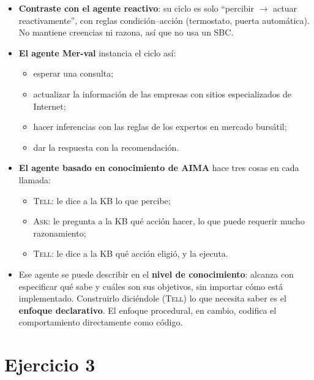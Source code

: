 \documentclass[11pt,a4paper]{article}
\begin{document}
\begin{extras}
\begin{itemize}
  \item \textbf{Contraste con el agente reactivo}: su ciclo es solo ``percibir $\to$ actuar reactivamente'', con reglas condición--acción (termostato, puerta automática). No mantiene creencias ni razona, así que no usa un SBC.
  \item \textbf{El agente Mer-val} instancia el ciclo así:
  \begin{itemize}
    \item esperar una consulta;
    \item actualizar la información de las empresas con sitios especializados de Internet;
    \item hacer inferencias con las reglas de los expertos en mercado bursátil;
    \item dar la respuesta con la recomendación.
  \end{itemize}
  \item \textbf{El agente basado en conocimiento de AIMA} hace tres cosas en cada llamada:
  \begin{itemize}
    \item \textsc{Tell}: le dice a la KB lo que percibe;
    \item \textsc{Ask}: le pregunta a la KB qué acción hacer, lo que puede requerir mucho razonamiento;
    \item \textsc{Tell}: le dice a la KB qué acción eligió, y la ejecuta.
  \end{itemize}
  \item Ese agente se puede describir en el \textbf{nivel de conocimiento}: alcanza con especificar qué sabe y cuáles son sus objetivos, sin importar cómo está implementado. Construirlo diciéndole (\textsc{Tell}) lo que necesita saber es el \textbf{enfoque declarativo}. El enfoque procedural, en cambio, codifica el comportamiento directamente como código.
\end{itemize}
\end{extras}

\section{Ejercicio 3}
\end{document}

